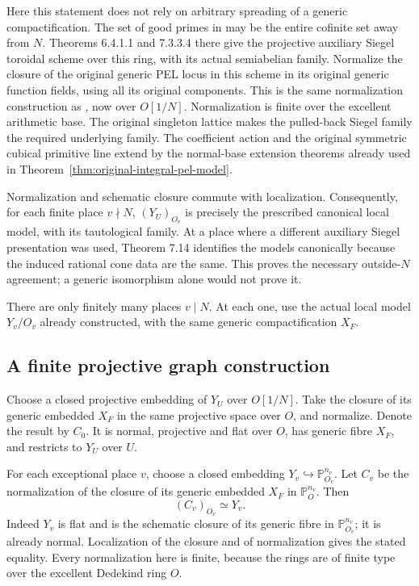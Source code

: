 Here this statement does not rely on arbitrary spreading of a
generic compactification.  The set of good primes in
\cite[Definition 1.4.1.1]{global-model-lan} may be the entire
cofinite set away from $N$.  Theorems 6.4.1.1 and 7.3.3.4 there
give the projective auxiliary Siegel toroidal scheme over this
ring, with its actual semiabelian family.  Normalize the closure
of the original generic PEL locus in this scheme in its original
generic function fields, using all its original components.
This is the same normalization construction as
\cite[(7.7)--(7.10)]{global-model-lan-ramified}, now over $O[1/N]$.
Normalization is finite over the excellent arithmetic base.
The original singleton lattice makes the pulled-back Siegel
family the required underlying family.  The coefficient action
and the original symmetric cubical primitive line extend by
the normal-base extension theorems already used in
Theorem~\ref{thm:original-integral-pel-model}.

Normalization and schematic closure commute with localization.
Consequently, for each finite place $v\nmid N$, $(Y_U)_{O_v}$
is precisely the prescribed canonical local model, with its
tautological family.  At a place where a different auxiliary
Siegel presentation was used, Theorem 7.14 identifies the models
canonically because the induced rational cone data are the same.
This proves the necessary outside-$N$ agreement; a generic
isomorphism alone would not prove it.

There are only finitely many places $v\mid N$.  At each one,
use the actual local model $Y_v/O_v$ already constructed, with
the same generic compactification $X_F$.

\subsection*{A finite projective graph construction}

Choose a closed projective embedding of $Y_U$ over $O[1/N]$.
Take the closure of its generic embedded $X_F$ in the same
projective space over $O$, and normalize.  Denote the result by
$C_0$.  It is normal, projective and flat over $O$, has generic
fibre $X_F$, and restricts to $Y_U$ over $U$.

For each exceptional place $v$, choose a closed embedding
$Y_v\hookrightarrow\mathbb P^{n_v}_{O_v}$.  Let $C_v$ be the
normalization of the closure of its generic embedded $X_F$ in
$\mathbb P^{n_v}_O$.  Then
\[
                         (C_v)_{O_v}\simeq Y_v.
\]
Indeed $Y_v$ is flat and is the schematic closure of its generic
fibre in $\mathbb P^{n_v}_{O_v}$; it is already normal.
Localization of the closure and of normalization gives the stated
equality.  Every normalization here is finite, because the rings
are of finite type over the excellent Dedekind ring $O$.

